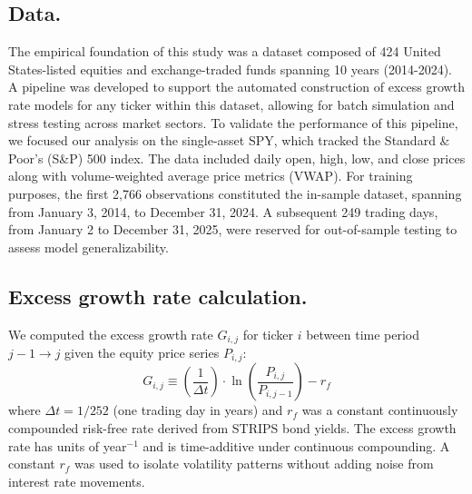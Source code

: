 \subsection*{Data.} The empirical foundation of this study was a dataset composed of 424 United States-listed equities and exchange-traded funds spanning 10 years (2014-2024). A pipeline was developed to support the automated construction of excess growth rate models for any ticker within this dataset, allowing for batch simulation and stress testing across market sectors. To validate the performance of this pipeline, we focused our analysis on the single-asset SPY, which tracked the Standard \& Poor's (S\&P) 500 index. The data included daily open, high, low, and close prices along with volume-weighted average price metrics (VWAP). For training purposes, the first 2,766 observations constituted the in-sample dataset, spanning from January 3, 2014, to December 31, 2024. A subsequent 249 trading days, from January 2 to December 31, 2025, were reserved for out-of-sample testing to assess model generalizability.

\subsection*{Excess growth rate calculation.}
We computed the excess growth rate $G_{i,j}$ for ticker $i$ between time period $j-1\rightarrow{j}$ given the equity price series $P_{i,j}$:
\begin{equation}
    G_{i,j} \equiv \left( \frac{1}{\Delta t} \right) \cdot \ln \left( \frac{P_{i,j}}{P_{i,j-1}} \right) - r_f
    \label{eq:growth_rate}
\end{equation}
where $\Delta t = 1/252$ (one trading day in years) and $r_f$ was a constant continuously compounded risk-free rate derived from STRIPS bond yields. The excess growth rate has units of year$^{-1}$ and is time-additive under continuous compounding. A constant $r_f$ was used to isolate volatility patterns without adding noise from interest rate movements.

